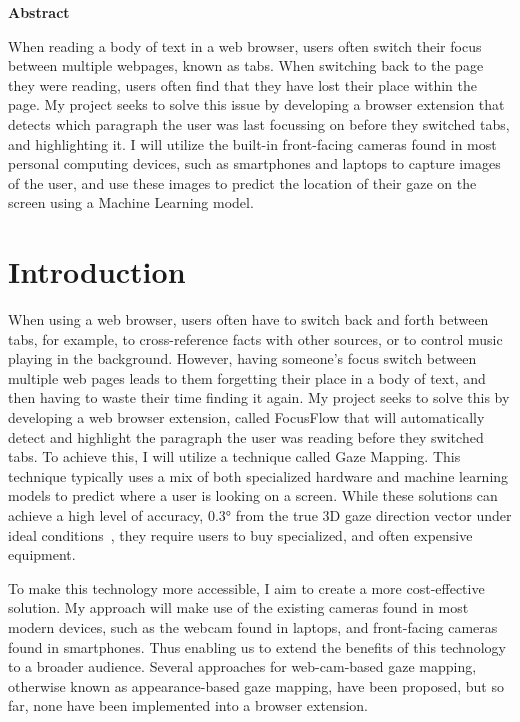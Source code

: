 \documentclass{report}
\begin{document}
\begin{titlepage}
\begin{center}
        {
            \textbf{Abstract}
        
            \vspace*{0.5cm}

            \begin{minipage}{0.5\textwidth}
                When reading a body of text in a web browser, users often switch their focus between multiple webpages, known as tabs. When switching back to the page they were reading, users often find that they have lost their place within the page. My project seeks to solve this issue by developing a browser extension that detects which paragraph the user was last focussing on before they switched tabs, and highlighting it. I will utilize the built-in front-facing cameras found in most personal computing devices, such as smartphones and laptops to capture images of the user, and use these images to predict the location of their gaze on the screen using a Machine Learning model. 
            \end{minipage}
        }
    \end{center}
\end{titlepage}

\tableofcontents

\chapter{Introduction}
\label{chap:intro}
\noindent
When using a web browser, users often have to switch back and forth between tabs, for example, to cross-reference facts with other sources, or to control music playing in the background. However, having someone's focus switch between multiple web pages leads to them forgetting their place in a body of text, and then having to waste their time finding it again. My project seeks to solve this by developing a web browser extension, called FocusFlow that will automatically detect and highlight the paragraph the user was reading before they switched tabs. To achieve this, I will utilize a technique called Gaze Mapping. This technique typically uses a mix of both specialized hardware and machine learning models to predict where a user is looking on a screen. While these solutions can achieve a high level of accuracy, \(\ang{0.3}\) from the true 3D gaze direction vector under ideal conditions~\cite{tobiiprofusion}, they require users to buy specialized, and often expensive equipment.

To make this technology more accessible, I aim to create a more cost-effective solution. My approach will make use of the existing cameras found in most modern devices, such as the webcam found in laptops, and front-facing cameras found in smartphones. Thus enabling us to extend the benefits of this technology to a broader audience. Several approaches for web-cam-based gaze mapping, otherwise known as appearance-based gaze mapping, have been proposed, but so far, none have been implemented into a browser extension. 
\end{document}
